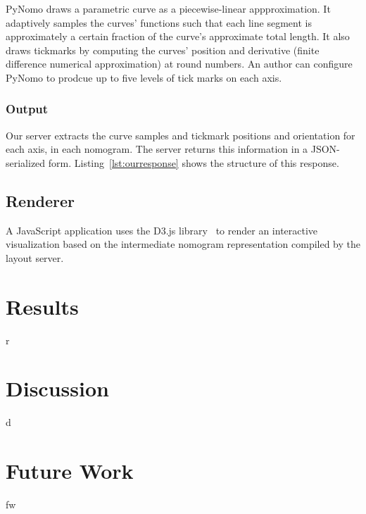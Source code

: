 \documentclass{proc}
\begin{document}
PyNomo draws a parametric curve as a piecewise-linear appproximation.
It adaptively samples the curves' functions such that each line
segment is approximately a certain fraction of the curve's approximate
total length.
It also draws tickmarks by computing the curves' position and
derivative (finite difference numerical approximation) at round
numbers.
An author can configure PyNomo to prodcue up to five levels of tick
marks on each axis.

\subsubsection{Output}
Our server extracts the curve samples and tickmark positions and
orientation for each axis, in each nomogram.
The server returns this information in a JSON-serialized form.
Listing~\ref{lst:ourresponse} shows the structure of this response.


\subsection{Renderer}
A JavaScript application uses the D3.js library~\cite{d3js} to render
an interactive visualization based on the intermediate nomogram
representation compiled by the layout server.

\section{Results}
r

\section{Discussion}
d

\section{Future Work}
fw


\end{document}

